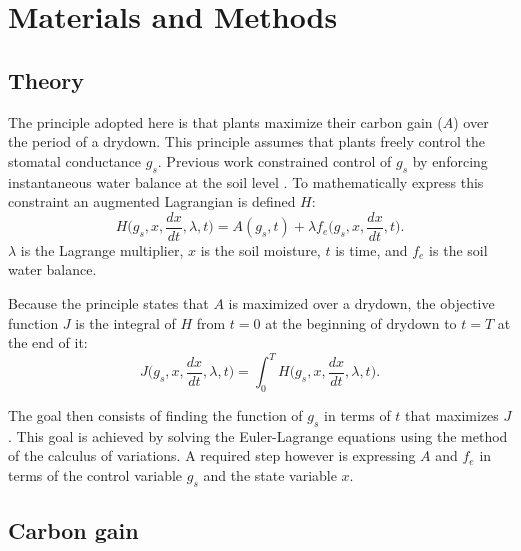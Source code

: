 \documentclass[utf8]{frontiersSCNS} %
\begin{document}
\section{Materials and Methods}

\subsection{Theory}

The principle adopted here is that plants maximize their carbon gain ($A$) over the period of a drydown. This principle assumes that plants freely control the stomatal conductance $g_s$. Previous work constrained control of $g_s$ by enforcing instantaneous water balance at the soil level \citep{Manzoni2013}. To mathematically express this constraint an augmented Lagrangian is defined $H$:
\begin{equation}
    \label{eqn:Hamiltonian}
    H\Big(g_s, x, \frac{dx}{dt}, \lambda, t\Big) = A(g_s, t) + \lambda f_e\Big(g_s, x, \frac{dx}{dt}, t\Big).
\end{equation}
$\lambda$ is the Lagrange multiplier, $x$ is the soil moisture, $t$ is time, and $f_e$ is the soil water balance.

Because the principle states that $A$ is maximized over a drydown, the objective function $J$ is the integral of $H$ from $t=0$ at the beginning of drydown to $t=T$ at the end of it:
\begin{equation}
    \label{eqn:Objective}
    J\Big(g_s, x, \frac{dx}{dt}, \lambda, t\Big) = \int_0^T H\Big(g_s, x, \frac{dx}{dt}, \lambda, t\Big).
\end{equation}

The goal then consists of finding the function of $g_s$ in terms of $t$ that maximizes $J$. This goal is achieved by solving the Euler-Lagrange equations using the method of the calculus of variations. A required step however is expressing $A$ and $f_e$ in terms of the control variable $g_s$ and the state variable $x$.

\subsection{Carbon gain}
\end{document}
